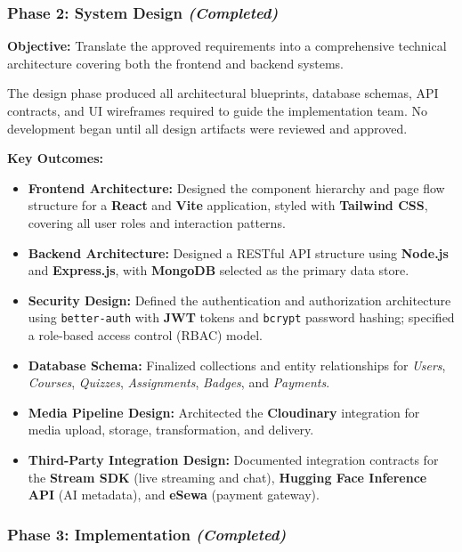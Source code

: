 \subsubsection*{Phase 2: System Design \hfill \textit{(Completed)}}

\textbf{Objective:} Translate the approved requirements into a comprehensive technical architecture covering both the frontend and backend systems.

The design phase produced all architectural blueprints, database schemas, API contracts, and UI wireframes required to guide the implementation team. No development began until all design artifacts were reviewed and approved.

\textbf{Key Outcomes:}
\begin{itemize}
    \item \textbf{Frontend Architecture:} Designed the component hierarchy and page flow structure for a \textbf{React} and \textbf{Vite} application, styled with \textbf{Tailwind CSS}, covering all user roles and interaction patterns.
    \item \textbf{Backend Architecture:} Designed a RESTful API structure using \textbf{Node.js} and \textbf{Express.js}, with \textbf{MongoDB} selected as the primary data store.
    \item \textbf{Security Design:} Defined the authentication and authorization architecture using \texttt{better-auth} with \textbf{JWT} tokens and \texttt{bcrypt} password hashing; specified a role-based access control (RBAC) model.
    \item \textbf{Database Schema:} Finalized collections and entity relationships for \textit{Users}, \textit{Courses}, \textit{Quizzes}, \textit{Assignments}, \textit{Badges}, and \textit{Payments}.
    \item \textbf{Media Pipeline Design:} Architected the \textbf{Cloudinary} integration for media upload, storage, transformation, and delivery.
    \item \textbf{Third-Party Integration Design:} Documented integration contracts for the \textbf{Stream SDK} (live streaming and chat), \textbf{Hugging Face Inference API} (AI metadata), and \textbf{eSewa} (payment gateway).
\end{itemize}

\subsubsection*{Phase 3: Implementation \hfill \textit{(Completed)}}

